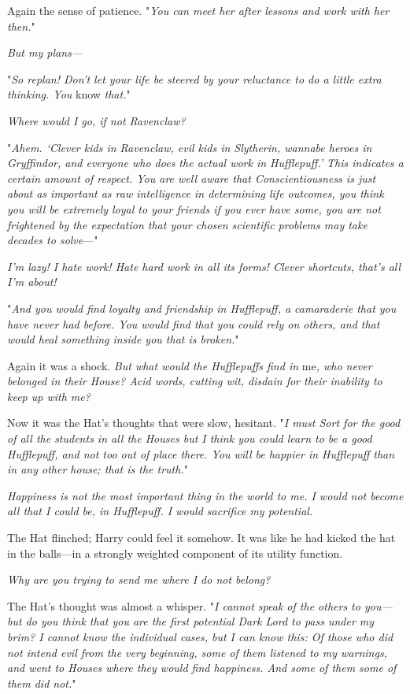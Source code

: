 Again the sense of patience. "\emph{You can meet her after lessons and work
with her then.}"

\emph{But my plans---}

"\emph{So replan! Don't let your life be steered by your reluctance to do a
little extra thinking. You} know \emph{that.}"

\emph{Where would I go, if not Ravenclaw?}

"\emph{Ahem. `Clever kids in Ravenclaw, evil kids in Slytherin, wannabe heroes
in Gryffindor, and everyone who does the actual work in Hufflepuff.' This
indicates a certain amount of respect. You are well aware that
Conscientiousness is just about as important as raw intelligence in determining
life outcomes, you think you will be extremely loyal to your friends if you
ever have some, you are not frightened by the expectation that your chosen
scientific problems may take decades to solve}\mbox{---}"

\emph{I'm lazy! I hate work! Hate hard work in all its forms! Clever shortcuts,
that's all I'm about!}

"\emph{And you would find loyalty and friendship in Hufflepuff, a camaraderie
that you have never had before. You would find that you could rely on others,
and that would heal something inside you that is broken.}"

Again it was a shock. \emph{But what would the Hufflepuffs find in} me\emph{,
who never belonged in their House? Acid words, cutting wit, disdain for their
inability to keep up with me?}

Now it was the Hat's thoughts that were slow, hesitant. "\emph{I must Sort for
the good of all the students in all the Houses{\el} but I think you could
learn to be a good Hufflepuff, and not too out of place there. You will be
happier in Hufflepuff than in any other house; that is the truth.}"

\emph{Happiness is not the most important thing in the world to me. I would not
become all that I could be, in Hufflepuff. I would sacrifice my potential.}

The Hat flinched; Harry could feel it somehow. It was like he had kicked the
hat in the balls---in a strongly weighted component of its utility function.

\emph{Why are you trying to send me where I do not belong?}

The Hat's thought was almost a whisper. "\emph{I cannot speak of the others to
you---but do you think that you are the first potential Dark Lord to pass under
my brim? I cannot know the individual cases, but I can know this: Of those who
did not intend evil from the very beginning, some of them listened to my
warnings, and went to Houses where they would find happiness. And some of
them{\el} some of them did not.}"

